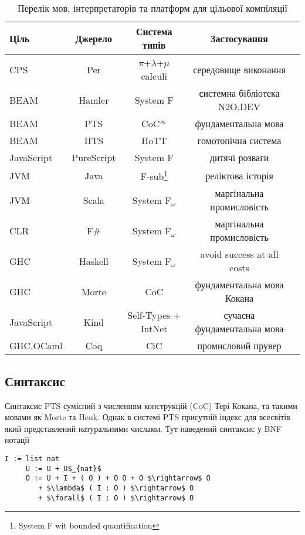 \begin{table}[ht]
\begin{center}
\caption{Перелік мов, інтерпретаторів та платформ для цільової компіляції}
\begin{tabular}{lcccc}
\hline
\rowcolor{ZimaBlue}
\textbf{Ціль} & \textbf{Джерело} & \textbf{Система типів} & \textbf{Застосування}\\
\hline
\rowcolor{LightGray}
CPS        & Per      & $\pi$+$\lambda$+$\mu$ calculi & середовище виконання \\
\rowcolor{LightGray}
BEAM       & Hamler     & System F            & системна бібліотека N2O.DEV \\
\rowcolor{LightGray}
BEAM       & PTS        & CoC$^\infty$        & фундаментальна мова \\
\rowcolor{LightGray}
BEAM       & HTS        & HoTT                & гомотопічна система \\
\hline
JavaScript & PureScript & System F & дитячі розваги \\
JVM        & Java       & F-sub\footnote{System F wit bounded quantification} & реліктова історія \\
JVM        & Scala      & System F$_\omega$   & маргінальна промисловість \\
CLR        & F\#        & System F$_\omega$   & маргінальна промисловість \\
GHC        & Haskell    & System F$_\omega$   & avoid success at all costs \\
GHC        & Morte      & CoC                 & фундаментальна мова Кокана \\
JavaScript & Kind       & Self-Types + IntNet & сучасна фундаментальна мова \\
GHC,OCaml  & Coq        & CiC                 & промисловий прувер \\
\hline
\end{tabular}
\end{center}
\end{table}

\subsection{Синтаксис}
Синтаксис PTS сумісний з численням конструкцій (CoC) Тері Кокана,
та такими мовами як Morte та Henk.
Однак в системі PTS присутній індекс для всесвітів який
представлений натуральними числами. Тут наведений синтаксис у BNF нотації

\begin{lstlisting}[mathescape=true]
     I := list nat
     U := U + U$_{nat}$
     O := U + I + ( O ) + O O + O $\rightarrow$ O
        + $\lambda$ ( I : O ) $\rightarrow$ O
        + $\forall$ ( I : O ) $\rightarrow$ O
\end{lstlisting}

